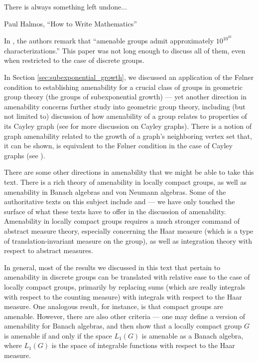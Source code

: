 \epigraph{There is always something left undone...}{Paul Halmos, ``How to Write Mathematics''}
In \cite[48]{brown_and_ozawa}, the authors remark that ``amenable groups admit approximately $10^{10^{10}}$ characterizations.'' This paper was not long enough to discuss all of them, even when restricted to the case of discrete groups.\newline

In Section \ref{sec:subexponential_growth}, we discussed an application of the Følner condition to establishing amenability for a crucial class of groups in geometric group theory (the groups of subexponential growth) --- yet another direction in amenability concerns further study into geometric group theory, including (but not limited to) discussion of how amenability of a group relates to properties of its Cayley graph (see \cite[Section 3.2]{loh_geometric_group_theory} for more discussion on Cayley graphs). There is a notion of graph amenability related to the growth of a graph's neighboring vertex set that, it can be shown, is equivalent to the Følner condition in the case of Cayley graphs (see \cite{monfared_cayley_graphs}).\newline

There are some other directions in amenability that we might be able to take this text. There is a rich theory of amenability in locally compact groups, as well as amenability in Banach algebras and von Neumann algebras. Some of the authoritative texts on this subject include \cite{kazhdan_property_t} and \cite{amenable_banach_algebras} --- we have only touched the surface of what these texts have to offer in the discussion of amenability. Amenability in locally compact groups requires a much stronger command of abstract measure theory, especially concerning the Haar measure (which is a type of translation-invariant measure on the group), as well as integration theory with respect to abstract measures.\newline

In general, most of the results we discussed in this text that pertain to amenability in discrete groups can be translated with relative ease to the case of locally compact groups, primarily by replacing sums (which are really integrals with respect to the counting measure) with integrals with respect to the Haar measure. One analogous result, for instance, is that compact groups are amenable. However, there are also other criteria --- one may define a version of amenability for Banach algebras, and then show that a locally compact group $G$ is amenable if and only if the space $L_1\left( G \right)$ is amenable as a Banach algebra, where $L_1\left( G \right)$ is the space of integrable functions with respect to the Haar measure.\newline

